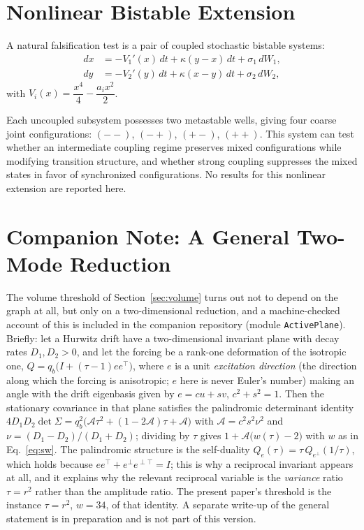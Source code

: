 \documentclass[11pt]{article}
\theoremstyle{plain}
\theoremstyle{remark}
\begin{document}
\section{Nonlinear Bistable Extension}

A natural falsification test is a pair of coupled stochastic bistable systems:
\begin{align}
  dx &= -V_1'(x)\,dt+\kappa(y-x)\,dt+\sigma_1\,dW_1, \label{eq:bist1}\\
  dy &= -V_2'(y)\,dt+\kappa(x-y)\,dt+\sigma_2\,dW_2, \label{eq:bist2}
\end{align}
with $V_i(x)=\dfrac{x^4}{4}-\dfrac{a_ix^2}{2}$.

Each uncoupled subsystem possesses two metastable wells, giving four coarse joint
configurations: $(--)$, $(-+)$, $(+-)$, $(++)$. This system can test whether an intermediate
coupling regime preserves mixed configurations while modifying transition structure, and
whether strong coupling suppresses the mixed states in favor of synchronized configurations.
No results for this nonlinear extension are reported here.

\section{Companion Note: A General Two-Mode Reduction}\label{sec:companion}

The volume threshold of Section~\ref{sec:volume} turns out not to depend on the graph at all,
but only on a two-dimensional reduction, and a machine-checked account of this is included in
the companion repository (module \texttt{ActivePlane}). Briefly: let a Hurwitz drift have a
two-dimensional invariant plane with decay rates $D_1,D_2>0$, and let the forcing be a rank-one
deformation of the isotropic one, $Q=q_b\bigl(I+(\tau-1)ee^{\top}\bigr)$, where $e$ is a unit
\emph{excitation direction} (the direction along which the forcing is anisotropic; $e$ here is
never Euler's number) making an angle with the drift eigenbasis given by $e=cu+sv$,
$c^2+s^2=1$. Then the stationary covariance in that plane satisfies the palindromic determinant
identity $4D_1D_2\det\Sigma=q_b^2\bigl(\mathcal{A}\tau^2+(1-2\mathcal{A})\tau+\mathcal{A}\bigr)$
with $\mathcal{A}=c^2s^2\nu^2$ and $\nu=(D_1-D_2)/(D_1+D_2)$; dividing by $\tau$ gives
$1+\mathcal{A}\bigl(w(\tau)-2\bigr)$ with $w$ as in Eq.~\eqref{eq:sw}. The palindromic
structure is the self-duality $Q_e(\tau)=\tau\,Q_{e^{\perp}}(1/\tau)$, which holds because
$ee^{\top}+e^{\perp}e^{\perp\top}=I$; this is why a reciprocal invariant appears at all, and it
explains why the relevant reciprocal variable is the \emph{variance} ratio $\tau=r^2$ rather
than the amplitude ratio. The present paper's threshold is the instance $\tau=r^2$,
$w=34$, of that identity. A separate write-up of the general statement is in preparation and is
not part of this version.
\end{document}
